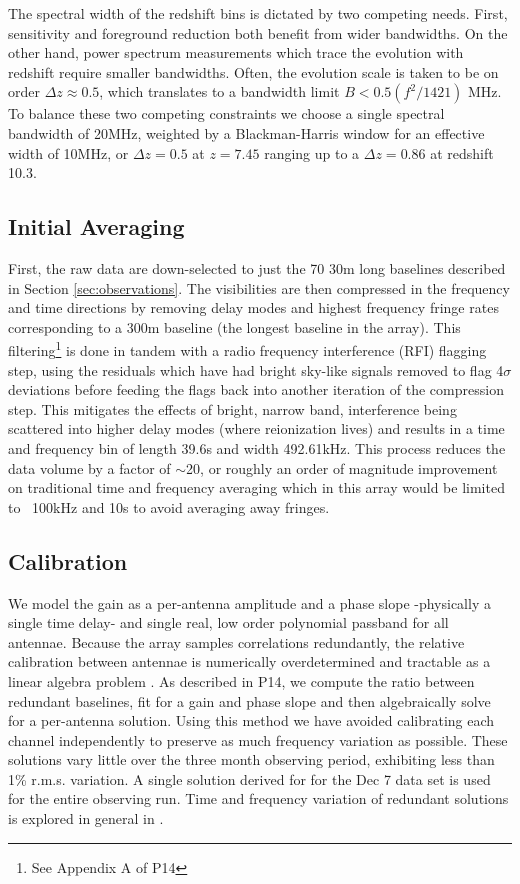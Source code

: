 \documentclass[preprint]{aastex}
\begin{document}
The spectral width of the redshift bins is dictated by two competing needs. First, sensitivity and foreground reduction both benefit from wider bandwidths. On the other hand, power spectrum measurements which trace the evolution with redshift require smaller bandwidths. Often, the evolution scale is taken to be on order $\Delta z \approx 0.5$, which translates to a bandwidth limit $B<0.5 (f^2/1421)$ MHz. To balance these two competing constraints we choose a single spectral bandwidth of 20MHz, weighted by a Blackman-Harris window for an effective width of 10MHz, or $\Delta z=0.5$ at $z=7.45$ ranging up to a $\Delta z = 0.86$ at redshift 10.3.




\subsection{Initial Averaging}
  First, the raw data are down-selected to just the 70 30m long baselines described in Section \ref{sec:observations}.  %
   The visibilities are then compressed in the frequency and time directions by removing delay modes and highest frequency fringe rates corresponding to a 300m baseline (the longest baseline in the array).  This filtering\footnote{See Appendix A of P14} is done in tandem with a radio frequency interference (RFI) flagging step, using the residuals which have had bright sky-like signals removed to flag 4$\sigma$ deviations before feeding the flags back into another iteration of the compression step. This mitigates the effects of bright, narrow band, interference  being scattered into higher delay modes (where reionization lives) and results in a time and frequency bin of length 39.6s and width 492.61kHz. 
  This process reduces the data volume by a factor of $\sim$20, or roughly an order of magnitude improvement on traditional time and frequency averaging which in this array would be limited to ~100kHz and 10s to avoid averaging away fringes.
  
\subsection{Calibration}
We model the gain as a per-antenna amplitude and a phase slope -physically a single time delay- and single real, low order polynomial passband for all antennae.  Because the array samples correlations redundantly, the relative calibration between antennae is numerically overdetermined and tractable as a linear algebra problem \citep{Liu:2010p10391}.  As described in P14, we compute the ratio between redundant baselines, fit for a gain and phase slope and then algebraically solve for a per-antenna solution.  Using this method we have avoided calibrating each channel independently to preserve as much frequency variation as possible.   These solutions vary little over the three month observing period, exhibiting less than 1\% r.m.s. variation. A single solution derived for for the Dec 7 data set is used for the entire observing run. Time and frequency variation of redundant solutions is explored in general in \citet{Zheng:2014p10467}.  
\end{document}
